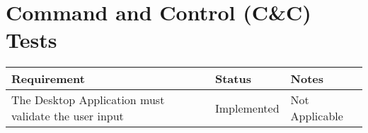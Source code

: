 \chapter{Command and Control (C\&C) Tests}

\noindent
\begin{longtable}{
|p{}%
|p{}%
|p{}|%
}
    \hline
    \centering Requirement     & \centering Status     & \centering\arraybackslash Notes     \\ \hline
    The Desktop Application must validate the
    user input &                                       \centering Implemented        & Not Applicable         \\ \hline


\end{longtable}
